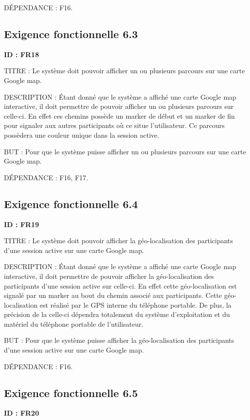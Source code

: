 \documentclass[titlepage, 12pt]{report}
\begin{document}
DÉPENDANCE : F16.

\subsection{Exigence fonctionnelle 6.3}

\textbf{ID : FR18}

TITRE : Le système doit pouvoir afficher un ou plusieurs parcours sur une carte Google map.

DESCRIPTION : Étant donné que le système a affiché une carte Google map interactive, il doit permettre de pouvoir afficher un ou plusieurs parcours sur celle-ci. En effet ces chemins possède un marker de début et un marker de fin pour signaler aux autres participants où ce situe l'utilisateur. Ce parcours possèdera une couleur unique dans la session active.

BUT : Pour que le système puisse afficher un ou plusieurs parcours sur une carte Google map.

DÉPENDANCE : F16, F17.

\subsection{Exigence fonctionnelle 6.4}

\textbf{ID : FR19}

TITRE : Le système doit pouvoir afficher la géo-localisation des participants d'une session active sur une carte Google map.

DESCRIPTION : Étant donné que le système a affiché une carte Google map interactive, il doit permettre de pouvoir afficher la géo-localisation des participants d'une session active sur celle-ci. En effet cette géo-localisation est signalé par un marker au bout du chemin associé aux participants. Cette géo-localisation est réalisé par le GPS interne du téléphone portable. De plus, la précision de la celle-ci dépendra totalement du système d'exploitation et du matériel du téléphone portable de l'utilisateur. 

BUT : Pour que le système puisse afficher la géo-localisation des participants d'une session active sur une carte Google map.

DÉPENDANCE : F16.

\subsection{Exigence fonctionnelle 6.5}

\textbf{ID : FR20}
\end{document}
